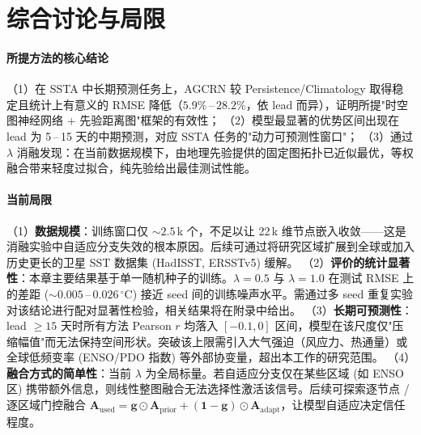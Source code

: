 \section{综合讨论与局限}
\label{sec:exp:discussion}

\paragraph{所提方法的核心结论}
（1）在 SSTA 中长期预测任务上，AGCRN 较 Persistence/Climatology 取得稳定且统计上有意义的 RMSE 降低（$5.9\%$\,--\,$28.2\%$，依 lead 而异），证明所提"时空图神经网络 + 先验距离图"框架的有效性；
（2）模型最显著的优势区间出现在 lead 为 5\,--\,15 天的中期预测，对应 SSTA 任务的"动力可预测性窗口"；
（3）通过 $\lambda$ 消融发现：在当前数据规模下，由地理先验提供的固定图拓扑已近似最优，等权融合带来轻度过拟合，纯先验给出最佳测试性能。

\paragraph{当前局限}
（1）\textbf{数据规模}：训练窗口仅 $\sim\!2.5$\,k 个，不足以让 22\,k 维节点嵌入收敛——这是消融实验中自适应分支失效的根本原因。后续可通过将研究区域扩展到全球或加入历史更长的卫星 SST 数据集 (HadISST, ERSSTv5) 缓解。
（2）\textbf{评价的统计显著性}：本章主要结果基于单一随机种子的训练。$\lambda=0.5$ 与 $\lambda=1.0$ 在测试 RMSE 上的差距 ($\sim\!0.005$\,--\,$0.026\,^{\circ}$C) 接近 seed 间的训练噪声水平。需通过多 seed 重复实验对该结论进行配对显著性检验，相关结果将在附录中给出。
（3）\textbf{长期可预测性}：lead $\ge\!15$ 天时所有方法 Pearson $r$ 均落入 $[-0.1, 0]$ 区间，模型在该尺度仅"压缩幅值"而无法保持空间形状。突破该上限需引入大气强迫（风应力、热通量）或全球低频变率 (ENSO/PDO 指数) 等外部协变量，超出本工作的研究范围。
（4）\textbf{融合方式的简单性}：当前 $\lambda$ 为全局标量。若自适应分支仅在某些区域 (如 ENSO 区) 携带额外信息，则线性整图融合无法选择性激活该信号。后续可探索逐节点 / 逐区域门控融合 $\boldsymbol{A}_{\text{used}} = \boldsymbol{g}\odot\boldsymbol{A}_{\text{prior}} + (\mathbf{1}-\boldsymbol{g})\odot\boldsymbol{A}_{\text{adapt}}$，让模型自适应决定信任程度。

